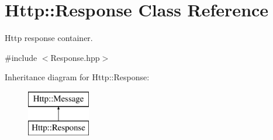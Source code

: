 \hypertarget{classHttp_1_1Response}{}\section{Http\+::Response Class Reference}
\label{classHttp_1_1Response}


Http response container.  




{\ttfamily \#include $<$Response.\+hpp$>$}

Inheritance diagram for Http\+::Response\+:\begin{figure}[H]
\begin{center}
\leavevmode
\includegraphics[height=2.000000cm]{classHttp_1_1Response}
\end{center}
\end{figure}
